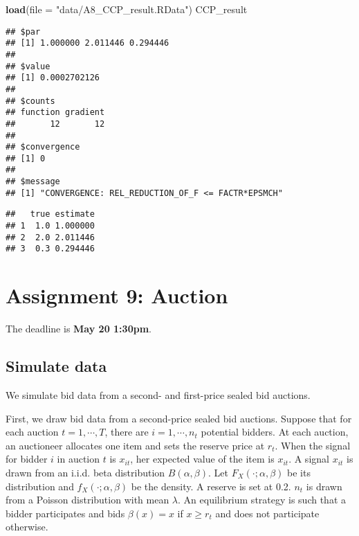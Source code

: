 \documentclass[
]{book}
\newenvironment{Shaded}{\begin{snugshade}}{\end{snugshade}}
\newcommand{\DataTypeTok}[1]{\textcolor[rgb]{0.13,0.29,0.53}{#1}}
\newcommand{\DecValTok}[1]{\textcolor[rgb]{0.00,0.00,0.81}{#1}}
\newcommand{\KeywordTok}[1]{\textcolor[rgb]{0.13,0.29,0.53}{\textbf{#1}}}
\newcommand{\NormalTok}[1]{#1}
\newcommand{\OperatorTok}[1]{\textcolor[rgb]{0.81,0.36,0.00}{\textbf{#1}}}
\newcommand{\StringTok}[1]{\textcolor[rgb]{0.31,0.60,0.02}{#1}}
\begin{document}
\begin{Shaded}
\begin{Highlighting}[]
\KeywordTok{load}\NormalTok{(}\DataTypeTok{file =} \StringTok{"data/A8_CCP_result.RData"}\NormalTok{)}
\NormalTok{CCP_result}
\end{Highlighting}
\end{Shaded}

\begin{verbatim}
## $par
## [1] 1.000000 2.011446 0.294446
## 
## $value
## [1] 0.0002702126
## 
## $counts
## function gradient 
##       12       12 
## 
## $convergence
## [1] 0
## 
## $message
## [1] "CONVERGENCE: REL_REDUCTION_OF_F <= FACTR*EPSMCH"
\end{verbatim}

\begin{Shaded}
\end{Shaded}

\begin{verbatim}
##   true estimate
## 1  1.0 1.000000
## 2  2.0 2.011446
## 3  0.3 0.294446
\end{verbatim}

\hypertarget{assignment-9-auction}{%
\chapter{Assignment 9: Auction}\label{assignment-9-auction}}

The deadline is \textbf{May 20 1:30pm}.

\hypertarget{simulate-data}{%
\section{Simulate data}\label{simulate-data}}

We simulate bid data from a second- and first-price sealed bid auctions.

First, we draw bid data from a second-price sealed bid auctions. Suppose that for each auction \(t = 1, \cdots, T\), there are \(i = 1, \cdots, n_t\) potential bidders. At each auction, an auctioneer allocates one item and sets the reserve price at \(r_t\). When the signal for bidder \(i\) in auction \(t\) is \(x_{it}\), her expected value of the item is \(x_{it}\). A signal \(x_{it}\) is drawn from an i.i.d. beta distribution \(B(\alpha, \beta)\). Let \(F_X(\cdot; \alpha, \beta)\) be its distribution and \(f_X(\cdot; \alpha, \beta)\) be the density. A reserve is set at 0.2. \(n_t\) is drawn from a Poisson distribution with mean \(\lambda\). An equilibrium strategy is such that a bidder participates and bids \(\beta(x) = x\) if \(x \ge r_t\) and does not participate otherwise.
\end{document}
